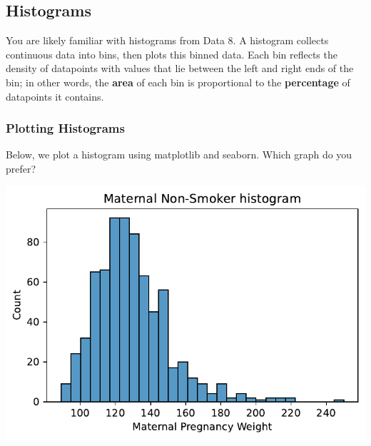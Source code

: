 \documentclass[
  letterpaper,
  DIV=11,
  numbers=noendperiod]{scrreprt}
\newenvironment{Shaded}{\begin{snugshade}}{\end{snugshade}}
\newcommand{\CommentTok}[1]{\textcolor[rgb]{0.37,0.37,0.37}{#1}}
\newcommand{\NormalTok}[1]{\textcolor[rgb]{0.00,0.23,0.31}{#1}}
\newcommand{\OperatorTok}[1]{\textcolor[rgb]{0.37,0.37,0.37}{#1}}
\newcommand{\StringTok}[1]{\textcolor[rgb]{0.13,0.47,0.30}{#1}}
\newcommand{\VariableTok}[1]{\textcolor[rgb]{0.07,0.07,0.07}{#1}}
\begin{document}
\subsection{Histograms}\label{histograms}

You are likely familiar with histograms from Data 8. A histogram
collects continuous data into bins, then plots this binned data. Each
bin reflects the density of datapoints with values that lie between the
left and right ends of the bin; in other words, the \textbf{area} of
each bin is proportional to the \textbf{percentage} of datapoints it
contains.

\subsubsection{Plotting Histograms}\label{plotting-histograms}

Below, we plot a histogram using matplotlib and seaborn. Which graph do
you prefer?

\begin{Shaded}
\end{Shaded}

\includegraphics{visualization_1/visualization_1_files/figure-pdf/cell-14-output-1.pdf}
\end{document}
